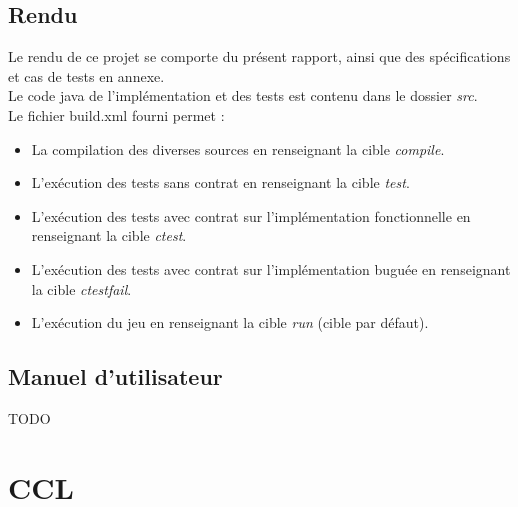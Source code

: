 \documentclass[a4paper, 11pt, notitlepage]{article}
\begin{document}
\subsection{Rendu}

Le rendu de ce projet se comporte du présent rapport, ainsi que des spécifications et cas de tests en annexe. \\
Le code java de l'implémentation et des tests est contenu dans le dossier \emph{src}. \\

Le fichier build.xml fourni permet : \\

\begin{itemize}
\item La compilation des diverses sources en renseignant la cible \emph{compile}.  \\
\item L'exécution des tests sans contrat en renseignant la cible \emph{test}. \\
\item L'exécution des tests avec contrat sur l'implémentation fonctionnelle en renseignant la cible \emph{ctest}. \\
\item L'exécution des tests avec contrat sur l'implémentation buguée en renseignant la cible \emph{ctestfail}. \\
\item L'exécution du jeu en renseignant la cible \emph{run} (cible par défaut).\\
\end{itemize}


\subsection{Manuel d'utilisateur}

TODO



\section*{CCL}

























\newpage
\pagestyle{empty}


\newpage
\pagestyle{empty}

\end{document}
